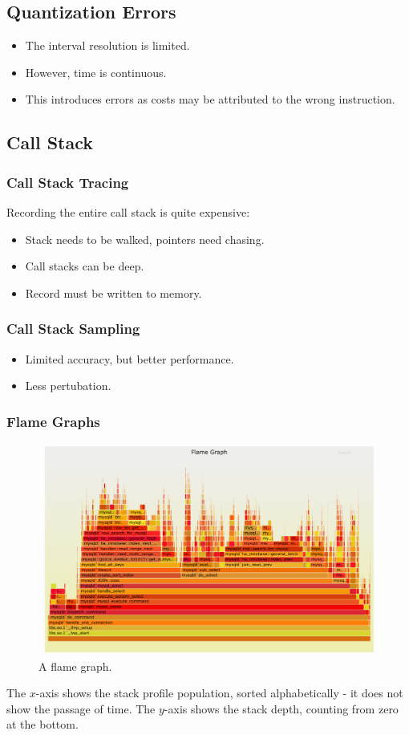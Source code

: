 \documentclass[11pt]{article}
\begin{document}
\subsection{Quantization Errors}
\begin{itemize}
  \item The interval resolution is limited.
  \item However, time is continuous.
  \item This introduces errors as costs may be attributed to the wrong instruction.
\end{itemize}

\subsection{Call Stack}
\subsubsection{Call Stack Tracing}
Recording the entire call stack is quite expensive:
\begin{itemize}
  \item Stack needs to be walked, pointers need chasing.
  \item Call stacks can be deep.
  \item Record must be written to memory.
\end{itemize}

\subsubsection{Call Stack Sampling}
\begin{itemize}
  \item Limited accuracy, but better performance.
  \item Less pertubation.
\end{itemize}

\subsubsection{Flame Graphs}
\begin{figure}[htb!]
  \centering
  \caption{A flame graph.}
  \includegraphics[width=\textwidth]{flamegraph}
\end{figure}
The $x$-axis shows the stack profile population, sorted alphabetically - it does not show the passage of time.
The $y$-axis shows the stack depth, counting from zero at the bottom.
\end{document}
